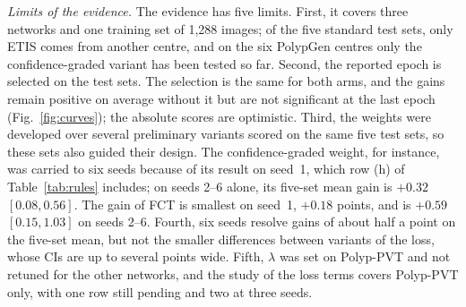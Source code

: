 \textit{Limits of the evidence.} The evidence has five limits. First, it covers three networks and one
training set of 1,288 images; of the five standard test sets, only ETIS comes from another centre, and
on the six PolypGen centres only the confidence-graded variant has been tested so far. Second, the
reported epoch is selected on the test sets. The selection is the same for both arms, and the gains
remain positive on average without it but are not significant at the last epoch
(Fig.~\ref{fig:curves}); the absolute scores are optimistic. Third, the weights were developed over
several preliminary variants scored on the same five test sets, so these sets also guided their design.
The confidence-graded weight, for instance, was carried to six seeds because of its result on seed~1,
which row (h) of Table~\ref{tab:rules} includes; on seeds 2--6 alone, its five-set mean gain is $+0.32$
$[0.08, 0.56]$. The gain of FCT is smallest on seed~1, $+0.18$ points, and is $+0.59$ $[0.15, 1.03]$ on
seeds 2--6. Fourth, six seeds resolve gains of about half a point on the five-set mean, but not the
smaller differences between variants of the loss, whose CIs are up to several points wide. Fifth,
$\lambda$ was set on Polyp-PVT and not retuned for the other networks, and the study of the loss terms
covers Polyp-PVT only, with one row still pending and two at three seeds.
